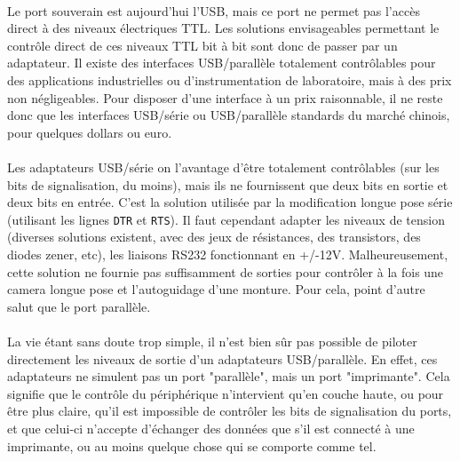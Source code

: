 \documentclass[11pt,a4paper]{book}
\begin{document}
\paragraph*{}
Le port souverain est aujourd'hui l'USB, mais ce port ne permet pas l'acc\`es
 direct \`a des niveaux \'electriques TTL. Les solutions envisageables
permettant le contr\^ole direct de ces niveaux TTL bit \`a bit sont donc de
passer par un adaptateur. Il existe des interfaces USB/parall\`ele totalement
contr\^olables pour des applications industrielles ou d'instrumentation de 
laboratoire, mais \`a des prix non n\'egligeables. Pour disposer d'une 
interface \`a un prix raisonnable, il ne reste donc que les interfaces USB/s\'erie 
ou USB/parall\`ele standards du march\'e chinois, pour quelques dollars ou euro.

\paragraph*{}
Les adaptateurs USB/s\'erie on l'avantage d'\^etre totalement contr\^olables (sur les bits
de signalisation, du moins), mais ils ne fournissent que deux bits en sortie et deux bits en
entr\'ee. C'est la solution utilis\'ee par la modification longue pose s\'erie (utilisant
les lignes {\tt DTR} et {\tt RTS}). Il faut cependant adapter les niveaux de tension 
(diverses solutions existent, avec des jeux de r\'esistances, des transistors, des diodes
 zener, etc), les liaisons RS232
 fonctionnant en +/-12V. Malheureusement, cette solution ne fournie pas suffisamment de 
 sorties pour contr\^oler \`a la fois une camera longue pose et l'autoguidage d'une
 monture. Pour cela, point d'autre salut que le port parall\`ele.

\paragraph*{} 
La vie \'etant sans doute trop simple, il n'est bien s\^ur pas possible de piloter directement
les niveaux de sortie d'un adaptateurs USB/parall\`ele. En effet, ces adaptateurs ne simulent pas
un port "parall\`ele", mais un port "imprimante". Cela signifie que le contr\^ole du p\'eriph\'erique
n'intervient qu'en couche haute, ou pour \^etre plus claire, qu'il est impossible de contr\^oler 
les bits de signalisation du ports, et que celui-ci n'accepte d'\'echanger des donn\'ees que
s'il est connect\'e \`a une imprimante, ou au moins quelque chose qui se comporte comme tel.
\end{document}
